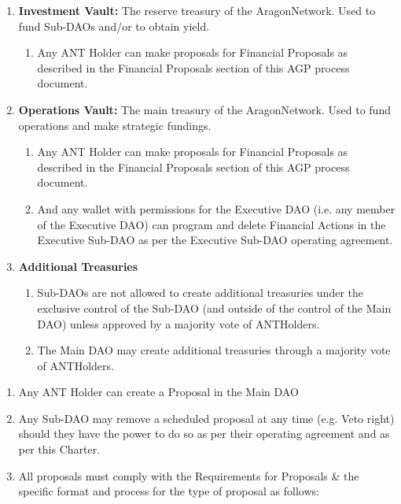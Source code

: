 \begin{enumerate}
	\begin{enumerate}
		\item \textbf{Investment Vault:} The reserve treasury of the \gls{AragonNetwork}. Used to fund Sub-\acp{DAO} and/or to obtain yield.
		\begin{enumerate}
			\item Any \ac{ANT} Holder can make proposals for Financial Proposals as described in the Financial Proposals section of this \ac{AGP} process document.
		\end{enumerate}
		\item \textbf{Operations Vault:} The main treasury of the \gls{AragonNetwork}. Used to fund operations and make strategic fundings.
		\begin{enumerate}
			\item Any \ac{ANT} Holder can make proposals for Financial Proposals as
			described in the Financial Proposals section of this \ac{AGP} process
			document.
			\item And any wallet with permissions for the Executive \ac{DAO} (i.e. any member of the Executive \ac{DAO}) can program and delete Financial Actions in the Executive Sub-\ac{DAO} as per the Executive Sub-\ac{DAO} operating agreement.
		\end{enumerate}

		\item \textbf{Additional Treasuries}
		\begin{enumerate}
			\item Sub-\acp{DAO} are not allowed to create additional treasuries under the exclusive control of the Sub-\ac{DAO} (and outside of the control of the Main \ac{DAO}) unless approved by a majority vote of \glspl{ANTHolder}.
			\item The Main \ac{DAO} may create additional treasuries through a majority vote of \glspl{ANTHolder}.
		\end{enumerate}  

	\end{enumerate}

	\begin{enumerate}
		\item Any \ac{ANT} Holder can create a Proposal in the Main \ac{DAO}
		\item Any Sub-\ac{DAO} may remove a scheduled proposal at any time (e.g. Veto right) should they have the power to do so as per their operating agreement and as per this Charter.
		\item All proposals must comply with the Requirements for Proposals \& the specific format and process for the type of proposal as follows:
		

\end{enumerate}
\end{enumerate}
